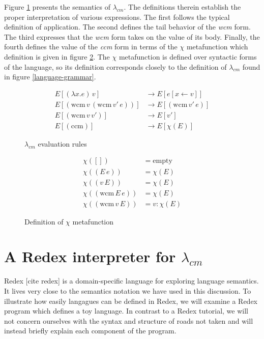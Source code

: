 \documentclass[ms,electronic,twosidetoc,letterpaper,chaptercenter,parttop]{byumsphd}
\begin{document}
Figure \ref{language-semantics} presents the semantics of $\lambda_{cm}$. The definitions
therein establish the proper interpretation of various expressions. The first follows the
typical definition of application. The second defines the tail behavior of the \emph{wcm}
form. The third expresses that the \emph{wcm} form takes on the value of its body.
Finally, the fourth defines the value of the \emph{ccm} form in terms of the $\chi$
metafunction which definition is given in figure \ref{chi-metafunction}. The $\chi$
metafunction is defined over syntactic forms of the language, so its definition
corresponds closely to the definition of $\lambda_{cm}$ found in figure
\ref{language-grammar}.

\begin{figure}
\begin{align*}
E[(\lambda x.e)\,v]                         &\rightarrow E[e[x\leftarrow v]]\\
E[(\mathrm{wcm}\,v\,(\mathrm{wcm}\,v'\,e))] &\rightarrow E[(\mathrm{wcm}\,v'\,e)]\\
E[(\mathrm{wcm}\,v\,v')]                    &\rightarrow E[v']\\
E[(\mathrm{ccm})]                           &\rightarrow E[\chi(E)]
\end{align*}
\caption{$\lambda_{cm}$ evaluation rules}
\label{language-semantics}
\end{figure}

\begin{figure}
\begin{align*}
\chi([])                   &= \mathrm{empty}\\
\chi((E\,e))               &= \chi(E)\\
\chi((v\,E))               &= \chi(E)\\
\chi((\mathrm{wcm}\,E\,e)) &= \chi(E)\\
\chi((\mathrm{wcm}\,v\,E)) &= v : \chi(E)
\end{align*}
\caption{Definition of $\chi$ metafunction}
\label{chi-metafunction}
\end{figure}

\section{A Redex interpreter for $\lambda_{cm}$}

Redex [cite redex] is a domain-specific language for exploring language semantics. It lives very 
close to the semantics notation we have used in this discussion. To illustrate how easily langagues 
can be defined in Redex, we will examine a Redex program which defines a toy language. In contrast to 
a Redex tutorial, we will not concern ourselves with the syntax and structure of roads not taken and 
will instead briefly explain each component of the program.
\end{document}
